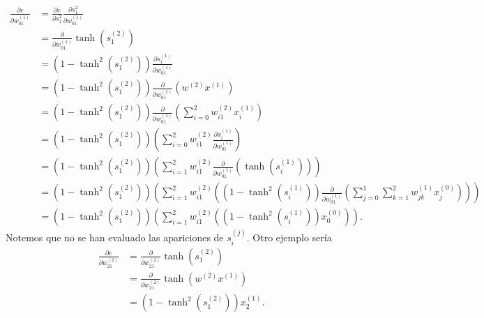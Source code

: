 \begin{align}
    \frac{\partial e}{\partial w^{(1)}_{01}} 
    &=
    \frac{\partial e}{\partial s_1^{2}}
    \frac{\partial s_1^{2}}{\partial w^{(1)}_{01}} 
    \\
    &= 
    \frac{\partial }{\partial w^{(1)}_{01}}
         \tanh \left(s^{(2)}_{1}\right)
    \\
    &= 
    \left(1- \tanh^2 \left(s^{(2)}_{1}\right)\right) 
    \frac{\partial s^{(1)}_{1}}{\partial w^{(1)}_{01}}
    \\
    &= 
    \left(1- \tanh^2 \left(s^{(2)}_{1}\right)\right) 
    \frac{\partial }{\partial w^{(1)}_{01}}
    \left(w^{(2)}x^{(1)}\right)
    \\
    &= 
    \left(1- \tanh^2 \left(s^{(2)}_{1}\right)\right) 
    \frac{\partial }{\partial w^{(1)}_{01}}
    \left(
        \sum^2_{i=0}
        w^{(2)}_{i1}x^{(1)}_i
    \right)
    \\
    &= 
    \left(1- \tanh^2 \left(s^{(2)}_{1}\right)\right) 
    \left(
        \sum^2_{i=0}
        w^{(2)}_{i1}\frac{\partial x^{(1)}_i }{\partial w^{(1)}_{01}}
    \right)
    \\
    &= 
    \left(1- \tanh^2 \left(s^{(2)}_{1}\right)\right) 
    \left(
        \sum^2_{i=1}
        w^{(2)}_{i1}\frac{\partial }{\partial w^{(1)}_{01}}
        \left(
            \tanh \left(s^{(1)}_{i}\right)
        \right)
    \right)
    \\
    &= 
    \left(1- \tanh^2 \left(s^{(2)}_{1}\right)\right) 
    \left(
        \sum^2_{i=1}
        w^{(2)}_{i1}
        \left(
            \left(1- \tanh^2 \left(s^{(1)}_{i}\right)\right)
            \frac{\partial  }{\partial w^{(1)}_{01}}
            \left(
                \sum^1_{j=0}\sum^2_{k=1}
                w^{(1)}_{j k}x^{(0)}_j
            \right)
        \right)
    \right)
    \\
    &= 
    \left(1- \tanh^2 \left(s^{(2)}_{1}\right)\right) 
    \left(
        \sum^2_{i=1}
        w^{(2)}_{i1}
        \left(
            \left(1- \tanh^2 \left(s^{(1)}_{i}\right)\right)
            x^{(0)}_0
        \right)
    \right).
\end{align}
Notemos que no se han evaluado las apariciones de $s_i^{(j)}$.
Otro ejemplo sería
\begin{align}
    \frac{\partial e}{\partial w^{(2)}_{21}} 
    &=
    \frac{\partial }{\partial w^{(2)}_{21}}
         \tanh \left(s^{(2)}_{1}\right)
    \\
    &= 
    \frac{\partial }{\partial w^{(2)}_{21}}
         \tanh \left(w^{(2)}x^{(1)}\right)
    \\
    &= \left(
    1- \tanh^2 \left(s^{(2)}_{1}\right) \right)x^{(1)}_2.
\end{align}

